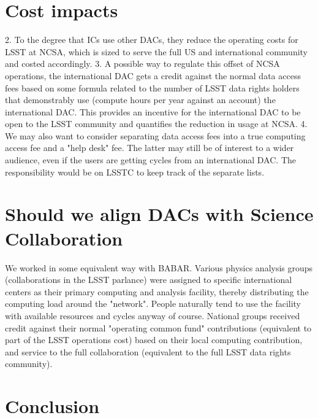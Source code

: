 \section{Cost impacts}
2. To the degree that ICs use other DACs, they reduce the operating costs for LSST at NCSA, which is sized to serve the full US and international community and costed accordingly.
3. A possible way to regulate this offset of NCSA operations, the international DAC gets a credit against the normal data access fees based on some formula related to the number of LSST data rights holders that demonstrably use (compute hours per year against an account) the international DAC. This provides an incentive for the international DAC to be open to the LSST community and quantifies the reduction in usage at NCSA.
4. We may also want to consider separating data access fees into a true computing access fee and a "help desk" fee. The latter may still be of interest to a wider audience, even if the users are getting cycles from an international DAC. The responsibility would be on LSSTC to keep track of the separate lists.

\section{Should we align DACs with Science Collaboration }
We worked in some equivalent way with BABAR. Various physics analysis groups (collaborations in the LSST parlance) were assigned to specific international centers as their primary computing and analysis facility, thereby distributing the computing load around the "network". People naturally tend to use the facility with available resources and cycles anyway of course. National groups received credit against their normal "operating common fund" contributions (equivalent to part of the LSST operations cost) based on their local computing contribution, and service to the full collaboration (equivalent to the full LSST data rights community).

\section{Conclusion}
